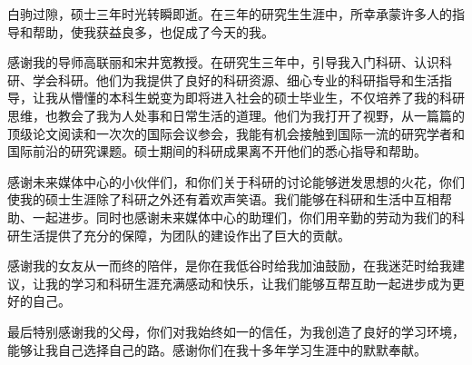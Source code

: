 \documentclass[master]{thesis-uestc}
\begin{document}
\thesisacknowledgement
白驹过隙，硕士三年时光转瞬即逝。在三年的研究生生涯中，所幸承蒙许多人的指导和帮助，使我获益良多，也促成了今天的我。

感谢我的导师高联丽和宋井宽教授。在研究生三年中，引导我入门科研、认识科研、学会科研。他们为我提供了良好的科研资源、细心专业的科研指导和生活指导，让我从懵懂的本科生蜕变为即将进入社会的硕士毕业生，不仅培养了我的科研思维，也教会了我为人处事和日常生活的道理。他们为我打开了视野，从一篇篇的顶级论文阅读和一次次的国际会议参会，我能有机会接触到国际一流的研究学者和国际前沿的研究课题。硕士期间的科研成果离不开他们的悉心指导和帮助。  

感谢未来媒体中心的小伙伴们，和你们关于科研的讨论能够迸发思想的火花，你们使我的硕士生涯除了科研之外还有着欢声笑语。我们能够在科研和生活中互相帮助、一起进步。同时也感谢未来媒体中心的助理们，你们用辛勤的劳动为我们的科研生活提供了充分的保障，为团队的建设作出了巨大的贡献。

感谢我的女友从一而终的陪伴，是你在我低谷时给我加油鼓励，在我迷茫时给我建议，让我的学习和科研生涯充满感动和快乐，让我们能够互帮互助一起进步成为更好的自己。

最后特别感谢我的父母，你们对我始终如一的信任，为我创造了良好的学习环境，能够让我自己选择自己的路。感谢你们在我十多年学习生涯中的默默奉献。

\thesisappendix






%
% 
%
% 
% 
%



\end{document}
